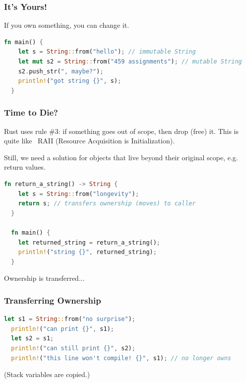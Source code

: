 \begin{frame}[fragile]
\frametitle{It's Yours!}

If you own something, you can change it.

\begin{lstlisting}[language=Rust]
  fn main() {
    let s = String::from("hello"); // immutable String
    let mut s2 = String::from("459 assignments"); // mutable String
    s2.push_str(", maybe?");
    println!("got string {}", s);
  }
\end{lstlisting}

\end{frame}


\begin{frame}[fragile]
\frametitle{Time to Die?}

Rust uses rule \#3: if something goes out of scope, then drop (free) it.
This is quite like \CPP~RAII (Resource Acquisition is Initialization).

Still, we need a solution for objects that live beyond their original scope, e.g.
return values.
\begin{lstlisting}[language=Rust]
  fn return_a_string() -> String {
    let s = String::from("longevity");
    return s; // transfers ownership (moves) to caller
  }

  fn main() {
    let returned_string = return_a_string();
    println!("string {}", returned_string);
  }
\end{lstlisting}

Ownership is transferred...

\end{frame}


\begin{frame}[fragile]
\frametitle{Transferring Ownership}

\begin{lstlisting}[language=Rust]
  let s1 = String::from("no surprise");
  println!("can print {}", s1);
  let s2 = s1;
  println!("can still print {}", s2);
  println!("this line won't compile! {}", s1); // no longer owns
\end{lstlisting}

(Stack variables are copied.)

\end{frame}


